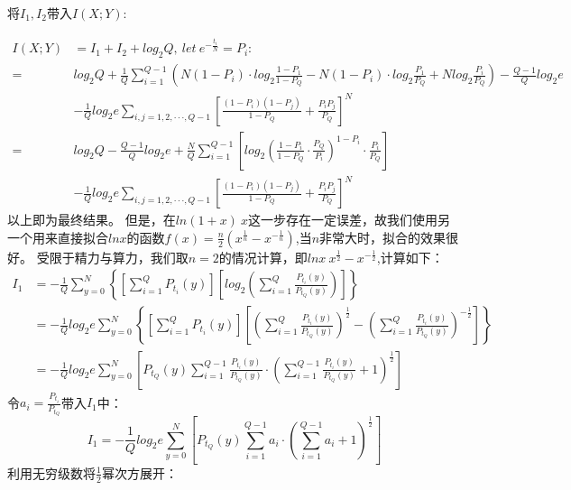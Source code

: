 \documentclass[12pt]{article}
\begin{document}
将$I_1,I_2$带入$I(X;Y)$:\par
\begin{equation*}
  \begin{aligned}
    I(X;Y) &= I_1+I_2+log_2Q,\ let\ e^{-\frac{t_i}{N}}=P_i :\\
    =& log_2Q+\frac{1}{Q}\sum\limits_{i=1}^{Q-1}\left(N(1-P_i)·log_2\frac{1-P_1}{1-P_Q}-N(1-P_i)·log_2\frac{P_1}{P_Q}+Nlog_2\frac{P_i}{P_Q}\right)-\frac{Q-1}{Q}log_2e \\
    &- \frac{1}{Q}log_2e\sum\limits_{i,j=1,2,···,Q-1}\left[\frac{(1-P_i)(1-P_j)}{1-P_Q}+\frac{P_iP_j}{P_Q}\right]^N \\
    =& log_2Q-\frac{Q-1}{Q}log_2e+\frac{N}{Q}\sum\limits_{i=1}^{Q-1}\left[log_2\left(\frac{1-P_i}{1-P_Q}·\frac{P_Q}{P_i}\right)^{1-P_i}·\frac{P_i}{P_Q}\right]\\
    &- \frac{1}{Q}log_2e\sum\limits_{i,j=1,2,···,Q-1}\left[\frac{(1-P_i)(1-P_j)}{1-P_Q}+\frac{P_iP_j}{P_Q}\right]^N
  \end{aligned}
\end{equation*}
以上即为最终结果。
但是，在$ln(1+x)~x$这一步存在一定误差，故我们使用另一个用来直接拟合$lnx$的函数$f(x)=\frac{n}{2}\left(x^{\frac{1}{n}}-x^{-\frac{1}{n}}\right)$,当$n$非常大时，拟合的效果很好。
受限于精力与算力，我们取$n=2$的情况计算，即$lnx~x^{\frac{1}{2}}-x^{-\frac{1}{2}}$,计算如下：
\begin{equation*}
  \begin{aligned}
    I_1 &= -\frac{1}{Q}\sum\limits_{y=0}^{N}\left\{\left[\sum\limits_{i=1}^QP_{t_i}(y)\right]\left[log_2\left(\sum\limits_{i=1}^Q\frac{P_{t_i}(y)}{P_{t_Q}(y)}\right)\right]\right\} \\
    &= -\frac{1}{Q}log_2e\sum\limits_{y=0}^{N}\left\{\left[\sum\limits_{i=1}^QP_{t_i}(y)\right]\left[\left(\sum\limits_{i=1}^Q\frac{P_{t_i}(y)}{P_{t_Q}(y)}\right)^{\frac{1}{2}}-\left(\sum\limits_{i=1}^Q\frac{P_{t_i}(y)}{P_{t_Q}(y)}\right)^{-\frac{1}{2}}\right]\right\} \\
    &= -\frac{1}{Q}log_2e\sum\limits_{y=0}^{N}\left[P_{t_Q}(y)\sum\limits_{i=1}^{Q-1}\frac{P_{t_i}(y)}{P_{t_Q}(y)}·\left(\sum\limits_{i=1}^{Q-1}\frac{P_{t_i}(y)}{P_{t_Q}(y)}+1\right)^{\frac{1}{2}}\right]
  \end{aligned}
\end{equation*}
令$a_i=\frac{P_{t_i}}{P_{t_Q}}$带入$I_1$中：
$$I_1=-\frac{1}{Q}log_2e\sum\limits_{y=0}^{N}\left[P_{t_Q}(y)\sum\limits_{i=1}^{Q-1}a_i·\left(\sum\limits_{i=1}^{Q-1}a_i+1\right)^{\frac{1}{2}}\right]$$
利用无穷级数将$\frac{1}{2}$幂次方展开：
\end{document}
